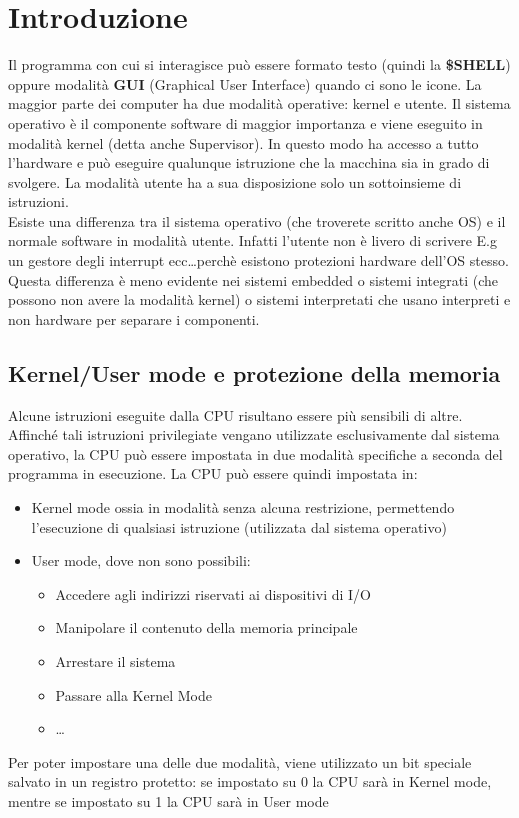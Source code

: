 \documentclass{article}
\begin{document}
\section{Introduzione}
Il programma con cui si interagisce può essere formato testo (quindi la \textbf{\$SHELL}) oppure modalità \textbf{GUI} (Graphical User Interface) quando ci sono le icone. La maggior parte dei computer ha due modalità operative: kernel e utente. Il sistema operativo è il componente software di maggior importanza e viene eseguito in modalità kernel (detta anche Supervisor). In questo modo ha accesso a tutto l'hardware e può eseguire qualunque istruzione che la macchina sia in  grado di svolgere. La modalità utente ha a sua disposizione solo un sottoinsieme di istruzioni.\\
Esiste una differenza tra il sistema operativo (che troverete scritto anche OS) e il normale software in modalità utente. Infatti l'utente non è livero di scrivere E.g un gestore degli interrupt ecc\dots perchè esistono protezioni hardware dell'OS stesso. \\
Questa differenza è meno evidente nei sistemi embedded o sistemi integrati (che possono non avere la modalità kernel) o sistemi interpretati che usano interpreti e non hardware per separare i componenti.

\subsection{Kernel/User mode e protezione della memoria}
Alcune istruzioni eseguite dalla CPU risultano essere più sensibili di altre. Affinché tali istruzioni privilegiate vengano utilizzate esclusivamente dal sistema operativo, la CPU può essere impostata in due modalità specifiche a seconda del programma in esecuzione.
La CPU può essere quindi impostata in:
\begin{itemize}
    \item Kernel mode ossia in modalità senza alcuna restrizione, permettendo l'esecuzione di qualsiasi istruzione (utilizzata dal sistema operativo)
    \item User mode, dove non sono possibili:
    \begin{itemize}
        \item Accedere agli indirizzi riservati ai dispositivi di I/O 
        \item Manipolare il contenuto della memoria principale
        \item Arrestare il sistema
        \item Passare alla Kernel Mode
        \item \dots
    \end{itemize}

\end{itemize}
Per poter impostare una delle due modalità, viene utilizzato un bit speciale salvato in un registro protetto: se impostato su 0 la CPU sarà in Kernel mode, mentre se impostato su 1 la CPU sarà in User mode
\end{document}
